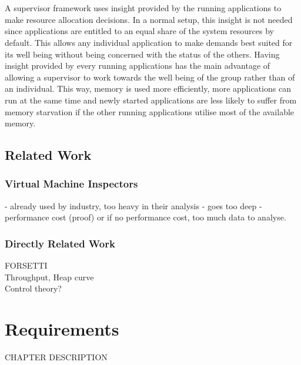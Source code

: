 \documentclass{l4proj}
\begin{document}
\\\\
\hspace*{3em} A supervisor framework uses insight provided by the running applications to make resource allocation decisions. In a normal setup, this insight is not needed since applications are entitled to an equal share of the system resources by default. This allows any individual application to make demands best suited for its well being without being concerned with the status of the others. Having insight provided by every running applications has the main advantage of allowing a supervisor to work towards the well being of the group rather than of an individual. This way, memory is used more efficiently, more applications can run at the same time and newly started applications are less likely to suffer from memory starvation if the other running applications utilise most of the available memory.
\section{Related Work}
\subsection{Virtual Machine Inspectors}
\hspace*{3em} - already used by industry, too heavy in their analysis - goes too deep - performance cost (proof) or if no performance cost, too much data to analyse.
\subsection{Directly Related Work}
FORSETTI\\
Throughput, Heap curve\\
Control theory?
\chapter{Requirements}
CHAPTER DESCRIPTION
\end{document}
